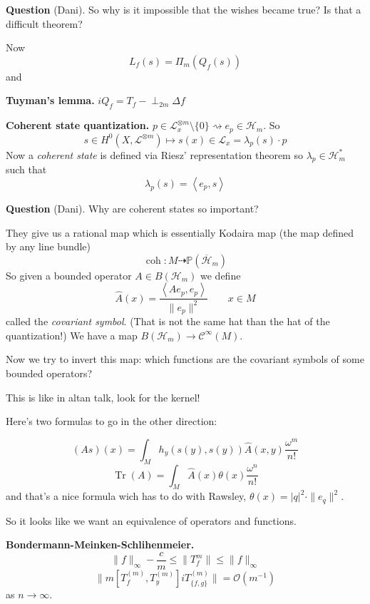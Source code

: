 \medskip\noindent
{\bf Question} (Dani).
So why is it impossible that the wishes
became true? Is that a difficult theorem?

Now
$$
L_f(s)=\Pi_m(Q_f(s))
$$
and

\medskip\noindent
{\bf Tuyman's lemma.}
$iQ_f=T_f-\perp_{2m}\Delta f$

\medskip\noindent
{\bf Coherent state quantization.}
$p \in \mathcal{L}_x^{\otimes m}\setminus
\{0\} \rightsquigarrow e_p \in
\mathcal{H}_m$. So
$$
s \in H^{0}(X,\mathcal{L}^{\otimes
m})\longmapsto
s(x)\in\mathcal{L}_x=\lambda_p(s)\cdot p
$$
Now a \emph{coherent state} is defined via
Riesz' representation theorem so $\lambda_p
\in\mathcal{H}_m^*$ such that
$$
\lambda_p(s)=\left\langle{} e_p,s
\right\rangle{}
$$

\medskip\noindent
{\bf Question} (Dani).
Why are coherent states so important?

They give us a rational map which is
essentially Kodaira map (the map defined by
any line bundle)
$$
\operatorname{coh}:M\dashrightarrow
\mathbb{P}(\overline{\mathcal{H}}_m)
$$
So given a bounded operator $A\in
B(\mathcal{H}_m)$ we define
$$
\hat{A}(x)=\frac{\left\langle{} Ae_p,e_p
\right\rangle{}}{\|e_p\|^2} \qquad x\in M
$$
called the \emph{covariant symbol}. (That is
not the same hat than the hat of the
quantization!) We have a map $B
(\mathcal{H}_m)\to \mathcal{C}^\infty(M)$.

Now we try to invert this map: which
functions are the covariant symbols of some
bounded operators?

\begin{remark}[Sergey]
\label{remark-suassuna-kernel}
This is like in altan talk, look for the
kernel!
\end{remark}

Here's two formulas to go in the other
direction:

$$
(As)(x)=\int_{M}h_y(s(y),s(y))
\hat{A}(x,y)\frac{\omega^m}{n!}
$$
$$
\operatorname{Tr}(A)=
\int_{M}\hat{A}(x)\theta(x)\frac{\omega^n}{n!}
$$
and that's a nice formula wich has to do with
Rawsley, $\theta(x)=|q|^2\cdot\|e_q\|^2$.

\begin{remark}[Dani]
\label{remark-suassuna-equivalence}
So it looks like we want an equivalence of
operators and functions.
\end{remark}

\medskip\noindent
{\bf Bondermann-Meinken-Schlihenmeier.}
$$
\|f\|_\infty-\frac{c}{m}\leq \|T_f^{m}\|\leq
\|f\|_\infty
$$
$$
\|m[T_f^{(m)}, T_y^{(m)}
]iT_{\{f,g\}}^{(m)}\|= \mathcal{O}(m^{-1})
$$
as $n\to \infty$.

